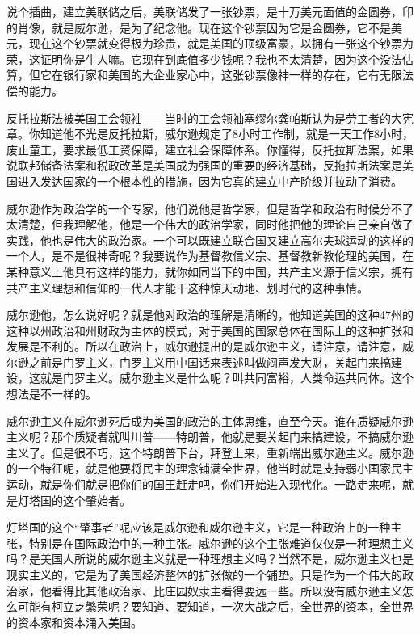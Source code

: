 \documentclass[UTF8, 12pt, a4paper]{ctexrep}
\begin{document}
说个插曲，建立美联储之后，美联储发了一张钞票，是十万美元面值的金圆券，印的肖像，就是威尔逊，是为了纪念他。现在这个钞票因为它是金圆券，它不是美元，现在这个钞票就变得极为珍贵，就是美国的顶级富豪，以拥有一张这个钞票为荣，这证明你是牛人嘛。它现在到底值多少钱呢？我也不太清楚，因为这个没法估算，但它在银行家和美国的大企业家心中，这张钞票像神一样的存在，它有无限法偿的能力。

反托拉斯法被美国工会领袖——当时的工会领袖塞缪尔龚帕斯认为是劳工者的大宪章。你知道他不光是反托拉斯，威尔逊规定了8小时工作制，就是一天工作8小时，废止童工，要求最低工资保障，建立社会保障体系。你懂得，反托拉斯法案，如果说联邦储备法案和税政改革是美国成为强国的重要的经济基础，反拖拉斯法案是美国进入发达国家的一个根本性的措施，因为它真的建立中产阶级并拉动了消费。

威尔逊作为政治学的一个专家，他们说他是哲学家，但是哲学和政治有时候分不了太清楚，但我理解他，他是一个伟大的政治学家，同时他把他的理论自己亲自做了实践，他也是伟大的政治家。一个可以既建立联合国又建立高尔夫球运动的这样的一个人，是不是很神奇呢？我要说作为基督教信义宗、基督教新教伦理的美国，在某种意义上他具有这样的能力，就你如同当下的中国，共产主义源于信义宗，拥有共产主义理想和信仰的一代人才能干这种惊天动地、划时代的这种事情。

威尔逊他，怎么说好呢？就是他对政治的理解是清晰的，他知道美国的这种47州的这种以州政治和州财政为主体的模式，对于美国的国家总体在国际上的这种扩张和发展是不利的。所以在政治上，威尔逊提出的是威尔逊主义，请注意，请注意，威尔逊之前是门罗主义，门罗主义用中国话来表述叫做闷声发大财，关起门来搞建设，这就是门罗主义。威尔逊主义是什么呢？叫共同富裕，人类命运共同体。这个想法是不一样的。

威尔逊主义在威尔逊死后成为美国的政治的主体思维，直至今天。谁在质疑威尔逊主义呢？那个质疑者就叫川普——特朗普，他就是要关起门来搞建设，不搞威尔逊主义了。但是很不巧，这个特朗普下台，拜登上来，重新端出威尔逊主义。威尔逊的一个特征呢，就是他要将民主的理念铺满全世界，他当时就是支持弱小国家民主运动，就是你们就是把你们的国王赶走吧，你们开始进入现代化。一路走来呢，就是灯塔国的这个肇始者。

灯塔国的这个“肇事者”呢应该是威尔逊和威尔逊主义，它是一种政治上的一种主张，特别是在国际政治中的一种主张。威尔逊的这个主张难道仅仅是一种理想主义吗？是美国人所说的威尔逊主义就是一种理想主义吗？当然不是，威尔逊主义也是现实主义的，它是为了美国经济整体的扩张做的一个铺垫。只是作为一个伟大的政治家，他看得比其他政治家、比庄园奴隶主看得要远一些。所以没有威尔逊主义怎么可能有柯立芝繁荣呢？要知道、要知道，一次大战之后，全世界的资本，全世界的资本家和资本涌入美国。
\end{document}
